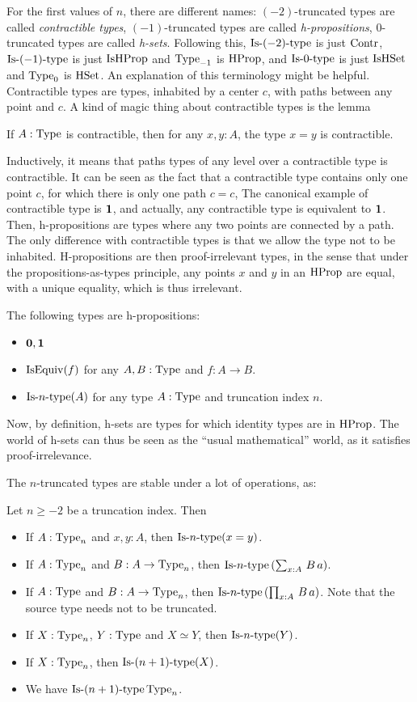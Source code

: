 For the first values of $n$, there are different names:
$(-2)$-truncated types are called {\em contractible types},
$(-1)$-truncated types are called {\em h-propositions},
$0$-truncated types are called {\em h-sets}. Following this,
$\mathop{\mathrm{Is{\hbox{-}}}(-2)\mathrm{{\hbox{-}} type}}$ is just $\operatorname{Contr}$, $\mathop{\mathrm{Is{\hbox{-}}}(-1)\mathrm{{\hbox{-}} type}}$ is just $\operatorname{IsHProp}$
and $\operatorname{Type}_{-1}$ is $\operatorname{HProp}$, and $\mathop{\mathrm{Is{\hbox{-}}}0\mathrm{{\hbox{-}} type}}$ is just $\operatorname{IsHSet}$ and
$\operatorname{Type}_0$ is $\operatorname{HSet}$. An explanation of this terminology might be
helpful. Contractible types are types, inhabited by a center $c$, with
paths between any point and $c$. A kind of magic thing about
contractible types is the lemma
\begin{lem}
  If $A:\operatorname{Type}$ is contractible, then for any $x,y:A$, the type $x=y$
  is contractible.
\end{lem}
Inductively, it means that paths types of any level over a contractible
type is contractible. It can be seen as the fact that a contractible
type contains only one point $c$, for which there is only one path
$c=c$, \etc{} The canonical example of contractible type is $\mathbf{1}$,
and actually, any contractible type is equivalent to $\mathbf{1}$.
Then, h-propositions are types where any two points are connected by a
path. The only difference with contractible types is that we allow the
type not to be inhabited. H-propositions are then proof-irrelevant
types, in the sense that under the propositions-as-types principle,
any points $x$ and $y$ in an $\operatorname{HProp}$ are equal, with a unique
equality, which is thus irrelevant.
\begin{lem}
  The following types are h-propositions:
  \begin{itemize}
  \item $\mathbf{0},\mathbf{1}$
  \item $\operatorname{IsEquiv}(f)$ for any $A,B:\operatorname{Type}$ and $f:A\to B$.
  \item $\mathop{\mathrm{Is{\hbox{-}}}n\mathrm{{\hbox{-}} type}}(A)$ for any type $A:\operatorname{Type}$ and truncation index $n$.
  \end{itemize}
\end{lem}
Now, by definition, h-sets are types for which identity types are in
$\operatorname{HProp}$. The world of h-sets can thus be seen as the ``usual
mathematical'' world, as it satisfies proof-irrelevance.

The $n$-truncated types are stable under a lot of operations, as:
\begin{lem}
  Let $n\geqslant -2$ be a truncation index. Then
  \begin{itemize}
  \item If $A:\operatorname{Type}_n$ and $x,y:A$, then $\mathop{\mathrm{Is{\hbox{-}}}n\mathrm{{\hbox{-}} type}} (x=y)$.
  \item If $A:\operatorname{Type}_n$ and $B:A\to\operatorname{Type}_n$, then $\mathop{\mathrm{Is{\hbox{-}}}n\mathrm{{\hbox{-}} type}}
    \left(\sum_{x:A}\, B\, a\right)$.
  \item If $A:\operatorname{Type}$ and $B:A\to\operatorname{Type}_n$, then $\mathop{\mathrm{Is{\hbox{-}}}n\mathrm{{\hbox{-}} type}} \left(\prod_{x:A}\, B\, a\right)$. Note that the source type needs not to be truncated.
  \item If $X:\operatorname{Type}_n$, $Y:\operatorname{Type}$ and $X\simeq Y$, then $\mathop{\mathrm{Is{\hbox{-}}}n\mathrm{{\hbox{-}} type}}(Y)$.
  \item If $X:\operatorname{Type}_n$, then $\mathop{\mathrm{Is{\hbox{-}}}(n+1)\mathrm{{\hbox{-}} type}}(X)$.
  \item We have $\mathop{\mathrm{Is{\hbox{-}}}(n+1)\mathrm{{\hbox{-}} type}}{\operatorname{Type}_n}$.
  \end{itemize}
\end{lem}

